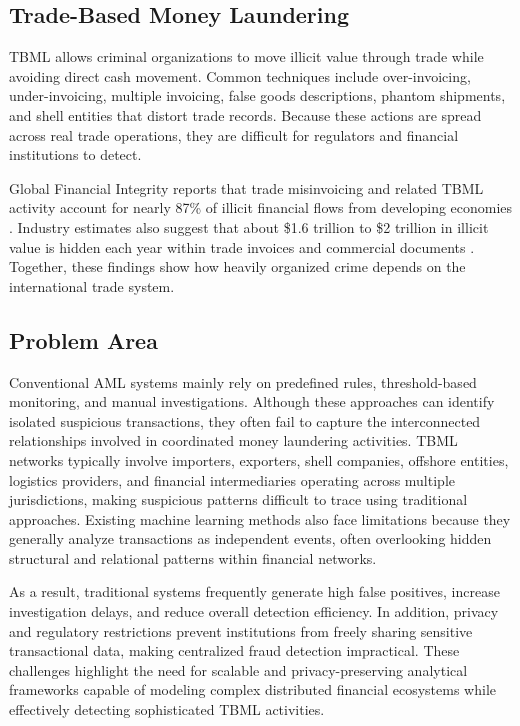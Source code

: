 \subsection[Trade-Based Money Laundering]{\textbf{Trade-Based Money Laundering}}

TBML allows criminal organizations to move illicit value through trade while avoiding direct cash movement. Common techniques include over-invoicing, under-invoicing, multiple invoicing, false goods descriptions, phantom shipments, and shell entities that distort trade records. Because these actions are spread across real trade operations, they are difficult for regulators and financial institutions to detect.

Global Financial Integrity reports that trade misinvoicing and related TBML activity account for nearly 87\% of illicit financial flows from developing economies \cite{gfiIllicitFlows}. Industry estimates also suggest that about \$1.6 trillion to \$2 trillion in illicit value is hidden each year within trade invoices and commercial documents \cite{imtf_tbml_scale}. Together, these findings show how heavily organized crime depends on the international trade system.

\subsection[Problem Area]{\textbf{Problem Area}}

Conventional AML systems mainly rely on predefined rules, threshold-based monitoring, and manual investigations. Although these approaches can identify isolated suspicious transactions, they often fail to capture the interconnected relationships involved in coordinated money laundering activities. TBML networks typically involve importers, exporters, shell companies, offshore entities, logistics providers, and financial intermediaries operating across multiple jurisdictions, making suspicious patterns difficult to trace using traditional approaches. Existing machine learning methods also face limitations because they generally analyze transactions as independent events, often overlooking hidden structural and relational patterns within financial networks.

As a result, traditional systems frequently generate high false positives, increase investigation delays, and reduce overall detection efficiency. In addition, privacy and regulatory restrictions prevent institutions from freely sharing sensitive transactional data, making centralized fraud detection impractical. These challenges highlight the need for scalable and privacy-preserving analytical frameworks capable of modeling complex distributed financial ecosystems while effectively detecting sophisticated TBML activities.



